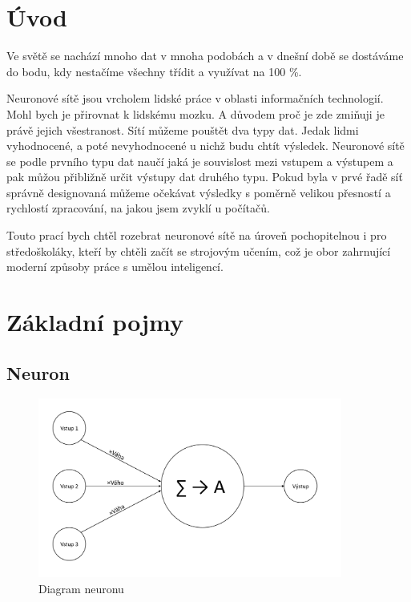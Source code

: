 \documentclass[12pt,a4paper]{report}
\begin{document}


\tableofcontents

\chapter{Úvod}
Ve světě se nachází mnoho dat v mnoha podobách a v dnešní době se dostáváme do bodu, kdy nestačíme všechny třídit a využívat na 100 \%.

Neuronové sítě jsou vrcholem lidské práce v oblasti informačních technologií. Mohl bych je přirovnat k lidskému mozku. A důvodem proč je zde zmiňuji je právě jejich všestranost. Sítí můžeme pouštět dva typy dat. Jedak lidmi vyhodnocené, a poté nevyhodnocené u nichž budu chtít výsledek. Neuronové sítě se podle prvního typu dat naučí jaká je souvislost mezi vstupem a výstupem a pak můžou přibližně určit výstupy dat druhého typu. Pokud byla v prvé řadě síť správně designovaná můžeme očekávat výsledky s poměrně velikou přesností a rychlostí zpracování, na jakou jsem zvyklí u počítačů.

Touto prací bych chtěl rozebrat neuronové sítě na úroveň pochopitelnou i pro středoškoláky, kteří by chtěli začít se strojovým učením, což je obor zahrnující moderní způsoby práce s umělou inteligencí.

\chapter{Základní pojmy} %

\section{Neuron}
	\begin{figure}[h]
		\centering
		\includegraphics[width=10cm]{neuron}
		\caption{Diagram neuronu}
	\end{figure}
\end{document}
